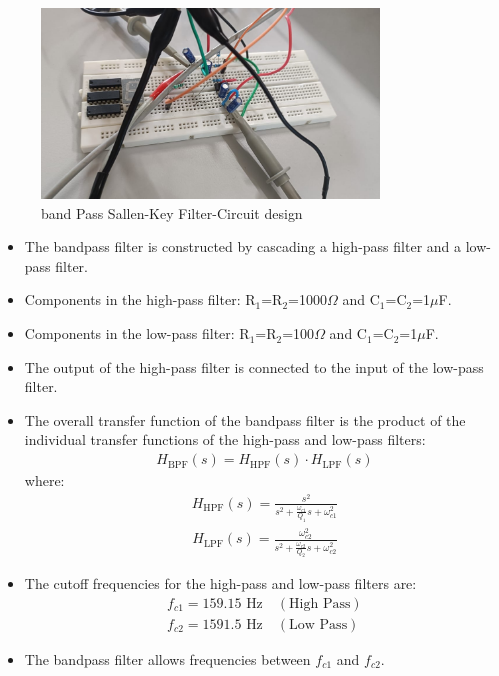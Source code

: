 \documentclass{article}
\begin{document}
\begin{figure}[H]
    \centering
    \includegraphics[width=0.8\textwidth]{figs/bandpasscircuit.jpeg}
    \caption{band Pass Sallen-Key Filter-Circuit design}
\end{figure}

\begin{itemize}
    \item The bandpass filter is constructed by cascading a high-pass filter and a low-pass filter.
    \item Components in the high-pass filter: R$_1$=R$_2$=1000$\Omega$ and C$_1$=C$_2$=1$\mu$F.
    \item Components in the low-pass filter: R$_1$=R$_2$=100$\Omega$ and C$_1$=C$_2$=1$\mu$F.
    \item The output of the high-pass filter is connected to the input of the low-pass filter.
    \item The overall transfer function of the bandpass filter is the product of the individual transfer functions of the high-pass and low-pass filters:
    \begin{align}
        H_{\text{BPF}}(s) = H_{\text{HPF}}(s) \cdot H_{\text{LPF}}(s)
    \end{align}
    where:
    \begin{align}
        H_{\text{HPF}}(s) = \frac{s^2}{s^2 + \frac{\omega_{c1}}{Q_1}s + \omega_{c1}^2}
    \end{align}
    \begin{align}
        H_{\text{LPF}}(s) = \frac{\omega_{c2}^2}{s^2 + \frac{\omega_{c2}}{Q_2}s + \omega_{c2}^2}
    \end{align}
    \item The cutoff frequencies for the high-pass and low-pass filters are:
    \begin{align}
        f_{c1} = 159.15 \text{ Hz} \quad (\text{High Pass}) \\
        f_{c2} = 1591.5 \text{ Hz} \quad (\text{Low Pass})
    \end{align}
    \item The bandpass filter allows frequencies between \( f_{c1} \) and \( f_{c2} \).
\end{itemize}
\end{document}
